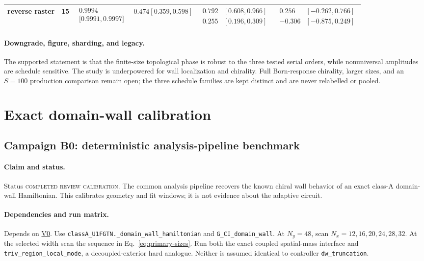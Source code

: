 \documentclass[aps,prx,twocolumn,floatfix,nofootinbib,superscriptaddress,longbibliography]{revtex4-2}
\newcommand{\code}[1]{\texttt{#1}}
\newcommand{\campref}[1]{\hyperref[camp:#1]{#1}}
\begin{document}
\begin{table}[t]
\begin{tabularx}{\textwidth}{@{}L{0.70}L{0.70}L{1.00}L{1.00}L{1.25}L{1.35}@{}}
reverse raster & 15
& $\begin{aligned}0.9994\\\lbrack0.9991,0.9997\rbrack\end{aligned}$
& $0.474[0.359,0.598]$
& $\begin{aligned}0.792&[0.608,0.966]\\0.255&[0.196,0.309]\end{aligned}$
& $\begin{aligned}0.256&[-0.262,0.766]\\-0.306&[-0.875,0.249]\end{aligned}$ \\
\bottomrule
\end{tabularx}
\end{table}

\paragraph*{Downgrade, figure, sharding, and legacy.}
The supported statement is that the finite-size topological phase is robust to the three
tested serial orders, while nonuniversal amplitudes are schedule sensitive.  The study is
underpowered for wall localization and chirality.  Full Born-response chirality, larger
sizes, and an $S=100$ production comparison remain open; the three schedule families are
kept distinct and are never relabelled or pooled.

\clearpage
\section{Exact domain-wall calibration}

\subsection{Campaign B0: deterministic analysis-pipeline benchmark}
\label{camp:B0}
\paragraph*{Claim and status.}
Status \textsc{completed review calibration}.  The common analysis pipeline recovers the known chiral wall behavior of
an exact class-A domain-wall Hamiltonian.  This calibrates geometry and fit windows; it is
not evidence about the adaptive circuit.

\paragraph*{Dependencies and run matrix.}
Depends on \campref{V0}.  Use \code{classA\_U1FGTN.\_domain\_wall\_hamiltonian} and
\code{G\_CI\_domain\_wall}.  At $N_y=48$, scan
$N_x=12,16,20,24,28,32$.  At the selected width scan the sequence in
Eq.~\eqref{eq:primary-sizes}.  Run both the exact coupled spatial-mass interface and
\code{triv\_region\_local\_mode}, a decoupled-exterior hard analogue.  Neither is assumed
identical to controller \code{dw\_truncation}.
\end{document}
